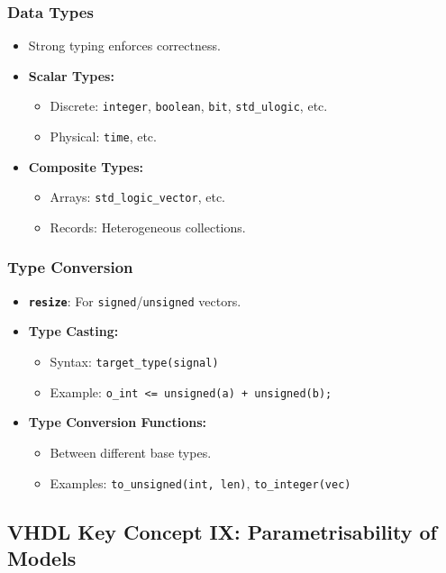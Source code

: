 \subsubsection{Data Types}
\begin{itemize}[leftmargin=1.5em]
    \item Strong typing enforces correctness.
    \item \textbf{Scalar Types:}
    \begin{itemize}
        \item Discrete: \texttt{integer}, \texttt{boolean}, \texttt{bit}, \texttt{std\_ulogic}, etc.
        \item Physical: \texttt{time}, etc.
    \end{itemize}
    \item \textbf{Composite Types:}
    \begin{itemize}
        \item Arrays: \texttt{std\_logic\_vector}, etc.
        \item Records: Heterogeneous collections.
    \end{itemize}
\end{itemize}

\subsubsection{Type Conversion}
\begin{itemize}[leftmargin=1.5em]
    \item \textbf{\texttt{resize}}: For \texttt{signed}/\texttt{unsigned} vectors.
    \item \textbf{Type Casting:}
    \begin{itemize}
        \item Syntax: \verb|target_type(signal)|
        \item Example: \verb|o_int <= unsigned(a) + unsigned(b);|
    \end{itemize}
    \item \textbf{Type Conversion Functions:}
    \begin{itemize}
        \item Between different base types.
        \item Examples: \verb|to_unsigned(int, len)|, \verb|to_integer(vec)|
    \end{itemize}
\end{itemize}

\subsection{VHDL Key Concept IX: Parametrisability of Models}

